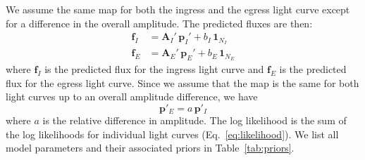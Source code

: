 \documentclass[modern]{aastex62}
\begin{document}
We assume the same map for both the ingress and the egress light curve except for  a difference in the overall amplitude.
The predicted fluxes are then:
\begin{align}
    \mathbf{f}_I&=\mathbf{A}_I'\,\mathbf{p}_I' +b_I\,\mathbf{1}_{N_I}\\
    \mathbf{f}_E&=\mathbf{A}_E'\,\mathbf{p}_E' +b_E\,\mathbf{1}_{N_E}
\end{align}
where $\mathbf{f}_I$ is the predicted flux for the ingress light curve and $\mathbf{f}_E$ is the predicted flux for the egress light curve.
Since we assume that the map is the same for both light curves up to an overall amplitude difference, we have
\begin{equation}
    \mathbf{p}'_E=a\,\mathbf{p}'_I
\end{equation}
where $a$ is the relative difference in amplitude.
The log likelihood is the sum of the log likelihoods for individual light curves (Eq.~\ref{eq:likelihood}).
We list all model parameters and their associated priors in Table~\ref{tab:priors}.
\end{document}
